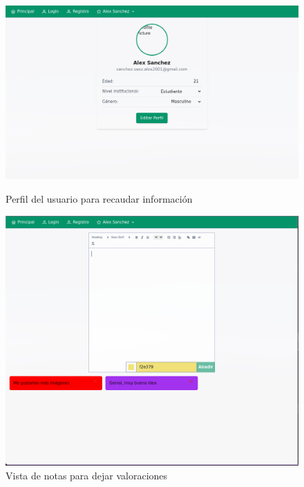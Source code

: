 \begin{anexos}
\begin{figure}[H]
	\centering
\begin{minipage}[b]{0.48\linewidth}  %
	\centering
	\includegraphics[width=\linewidth]{Graphics/capturas/profile.png}
	\caption{Perfil del usuario para recaudar informaci\'on }
		\label{user-profile} 
\end{minipage}%
\hfill
\begin{minipage}[b]{0.48\linewidth} %
	\centering
	\includegraphics[width=\linewidth]{Graphics/capturas/notes.png}
	\caption{Vista de notas para dejar valoraciones } 
		\label{notes}          
\end{minipage}
\end{figure}


\end{anexos}
